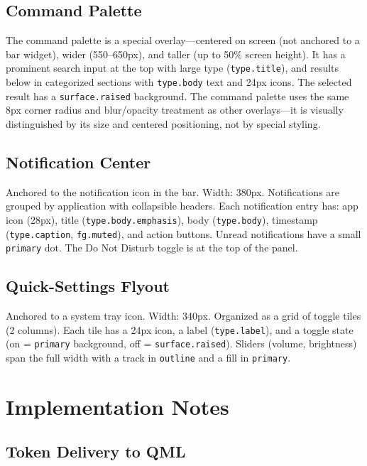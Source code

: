 \documentclass[11pt,a4paper]{article}
\begin{document}
\subsection{Command Palette}

The command palette is a special overlay---centered on screen (not anchored to a bar widget), wider (550--650px), and taller (up to 50\% screen height). It has a prominent search input at the top with large type (\texttt{type.title}), and results below in categorized sections with \texttt{type.body} text and 24px icons. The selected result has a \texttt{surface.raised} background. The command palette uses the same 8px corner radius and blur/opacity treatment as other overlays---it is visually distinguished by its size and centered positioning, not by special styling.

\subsection{Notification Center}

Anchored to the notification icon in the bar. Width: 380px. Notifications are grouped by application with collapsible headers. Each notification entry has: app icon (28px), title (\texttt{type.body.emphasis}), body (\texttt{type.body}), timestamp (\texttt{type.caption}, \texttt{fg.muted}), and action buttons. Unread notifications have a small \texttt{primary} dot. The Do Not Disturb toggle is at the top of the panel.

\subsection{Quick-Settings Flyout}

Anchored to a system tray icon. Width: 340px. Organized as a grid of toggle tiles (2 columns). Each tile has a 24px icon, a label (\texttt{type.label}), and a toggle state (on = \texttt{primary} background, off = \texttt{surface.raised}). Sliders (volume, brightness) span the full width with a track in \texttt{outline} and a fill in \texttt{primary}.


\section{Implementation Notes}
\label{sec:implementation}

\subsection{Token Delivery to QML}
\end{document}
